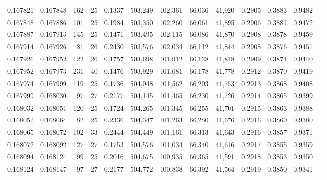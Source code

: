 \begin{tabular}{rrrrrrrrrrrrr}
0.167821 & 0.167848 & 162 &  25 &                                     0.1337 & 503,249 & 102,361 &  66,036 &  41,920 & 0.2905 & 0.3883 & 0.9482 \\
0.167848 & 0.167886 & 101 &  25 &                                     0.1984 & 503,350 & 102,260 &  66,061 &  41,895 & 0.2906 & 0.3881 & 0.9472 \\
0.167887 & 0.167913 & 145 &  25 &                                     0.1471 & 503,495 & 102,115 &  66,086 &  41,870 & 0.2908 & 0.3878 & 0.9459 \\
0.167914 & 0.167926 &  81 &  26 &                                     0.2430 & 503,576 & 102,034 &  66,112 &  41,844 & 0.2908 & 0.3876 & 0.9451 \\
0.167926 & 0.167952 & 122 &  26 &                                     0.1757 & 503,698 & 101,912 &  66,138 &  41,818 & 0.2909 & 0.3874 & 0.9440 \\
0.167952 & 0.167973 & 231 &  40 &                                     0.1476 & 503,929 & 101,681 &  66,178 &  41,778 & 0.2912 & 0.3870 & 0.9419 \\
0.167974 & 0.167999 & 119 &  25 &                                     0.1736 & 504,048 & 101,562 &  66,203 &  41,753 & 0.2913 & 0.3868 & 0.9408 \\
0.167999 & 0.168030 &  97 &  27 &                                     0.2177 & 504,145 & 101,465 &  66,230 &  41,726 & 0.2914 & 0.3865 & 0.9399 \\
0.168032 & 0.168051 & 120 &  25 &                                     0.1724 & 504,265 & 101,345 &  66,255 &  41,701 & 0.2915 & 0.3863 & 0.9388 \\
0.168052 & 0.168064 &  82 &  25 &                                     0.2336 & 504,347 & 101,263 &  66,280 &  41,676 & 0.2916 & 0.3860 & 0.9380 \\
0.168065 & 0.168072 & 102 &  33 &                                     0.2444 & 504,449 & 101,161 &  66,313 &  41,643 & 0.2916 & 0.3857 & 0.9371 \\
0.168072 & 0.168092 & 127 &  27 &                                     0.1753 & 504,576 & 101,034 &  66,340 &  41,616 & 0.2917 & 0.3855 & 0.9359 \\
0.168094 & 0.168124 &  99 &  25 &                                     0.2016 & 504,675 & 100,935 &  66,365 &  41,591 & 0.2918 & 0.3853 & 0.9350 \\
0.168124 & 0.168147 &  97 &  27 &                                     0.2177 & 504,772 & 100,838 &  66,392 &  41,564 & 0.2919 & 0.3850 & 0.9341 \\

\end{tabular}
